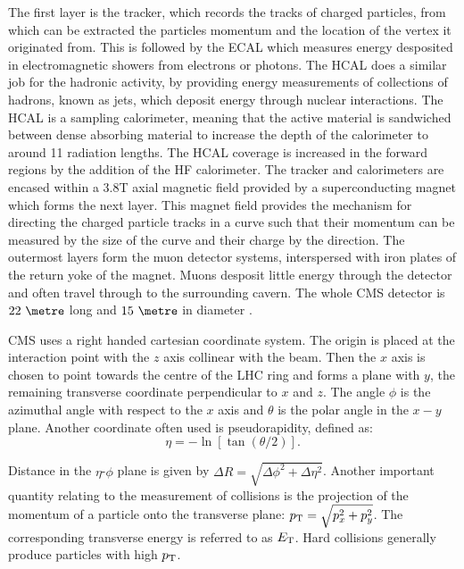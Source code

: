 The first layer is the tracker, which records the tracks of charged particles,
from which can be extracted the particles momentum and the location of the
vertex it originated from. This is followed by the \ac{ECAL} which measures
energy desposited in electromagnetic showers from electrons or photons. The
\ac{HCAL} does a similar job for the hadronic activity, by providing energy
measurements of collections of hadrons, known as jets, which deposit energy
through nuclear interactions. The \ac{HCAL} is a sampling calorimeter, meaning
that the active material is sandwiched between dense absorbing material to
increase the depth of the calorimeter to around 11 radiation lengths. The
\ac{HCAL} coverage is increased in the forward regions by the addition of 
the \ac{HF} calorimeter. The tracker and calorimeters are encased within a 3.8T axial magnetic
field provided by a superconducting magnet which forms the next layer. This
magnet field provides the mechanism for directing the charged particle tracks in
a curve such that their momentum can be measured by the size of the curve and
their charge by the direction. The
outermost layers form the muon detector systems, interspersed with iron plates
of the return yoke of the magnet. Muons desposit little energy
through the detector and often travel through to the surrounding cavern. The
whole CMS detector is $22~\metre$ long and $15~\metre$ in diameter
\cite{Chatrchyan:2008aa}.

CMS uses a right handed cartesian coordinate system. The
origin is placed at the interaction point with the $z$ axis collinear with the
beam. Then the $x$ axis is chosen to point towards the centre of the LHC ring
and forms a plane with $y$, the remaining transverse coordinate perpendicular to
$x$ and $z$. The angle $\phi$ is the azimuthal angle with respect to the $x$
axis and $\theta$ is the polar angle in the $x-y$ plane. Another coordinate
often used is pseudorapidity, defined as:
\begin{equation}
\eta = - \ln[\tan(\theta/2)]. 
\end{equation}

Distance in the $\eta$-$\phi$ plane is given by $\Delta R =
\sqrt{\Delta\phi^{2} + \Delta\eta^{2}}$.
Another important quantity relating to the measurement of collisions is the
projection of the momentum of a particle onto the transverse plane: $p_{\mathrm{T}} =
\sqrt{p_{x}^{2} + p_{y}^{2}}$. The corresponding transverse energy is referred
to as $E_{\text T}$. Hard collisions generally produce particles with
high $p_{\mathrm{T}}$.

